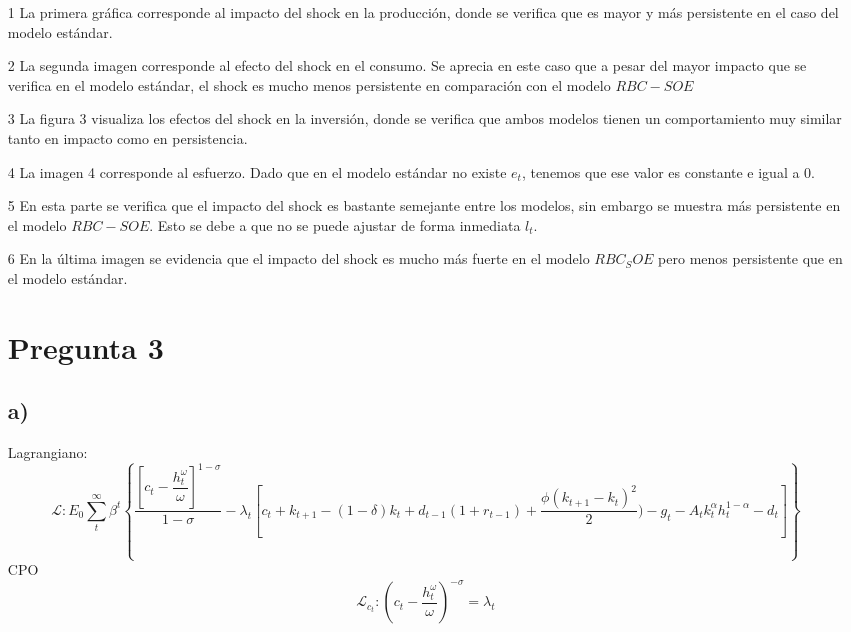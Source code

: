 \documentclass{article}
\begin{document}
\begin{enumerate}
\item[1] La primera gráfica corresponde al impacto del shock en la producción, donde se verifica que es mayor y más persistente en el caso del modelo estándar.

\item[2] La segunda imagen corresponde al efecto del shock en el consumo. Se aprecia en este caso que a pesar del mayor impacto que se verifica en el modelo estándar, el shock es mucho menos persistente en comparación con el modelo $RBC- SOE$ 
	
\item[3] La figura 3 visualiza los efectos del shock en la inversión, donde se verifica que ambos modelos tienen un comportamiento muy similar tanto en impacto como en persistencia.
 
\item[4] La imagen 4 corresponde al esfuerzo. Dado que en el modelo estándar no existe $e_t$, tenemos que ese valor es constante e igual a 0.

\item[5] En esta parte se verifica que el impacto del shock es bastante semejante entre los modelos, sin embargo se muestra más persistente en el modelo $RBC-SOE$. Esto se debe a que no se puede ajustar de forma inmediata $l_t$.

\item[6] En la última imagen se evidencia que el impacto del shock es mucho más fuerte en el modelo $RBC_SOE$ pero menos persistente que en el modelo estándar.

\newpage
	\section{Pregunta 3}
	\subsection {a)}
	
	Lagrangiano:
	$$
	\mathcal{L}:E_{0}\sum_{t}^\infty \beta^{t}\left\lbrace\dfrac{[c_{t} - \dfrac{h_{t}^\omega}{\omega}]^{1-\sigma}}{1-\sigma}-\lambda_{t}
	[c_t+k_{t+1}-(1-\delta)k_t+d_{t-1}(1+r_{t-1})+\dfrac{\phi(k_{t+1}-k_t)^2}{2})-g_t-A_t k_t^\alpha h_t^{1-\alpha}-d_t]\right\rbrace 
$$
	CPO  
	\begin{equation}
		\mathcal{L}_{c_{t}}: 
		(c_{t} - \dfrac{h_{t}^\omega}{\omega})^{-\sigma} = \lambda_t
	\end{equation}
	

\end{enumerate}
\end{document}
